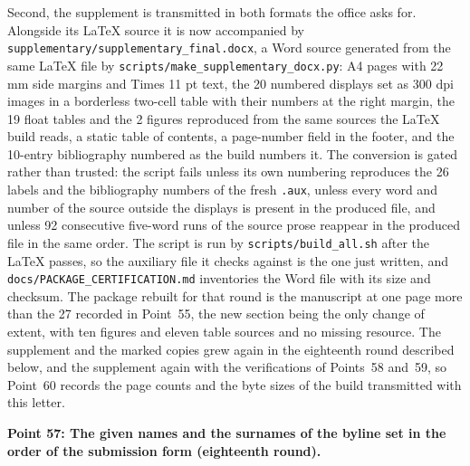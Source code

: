 \documentclass[11pt,a4paper]{article}
\begin{document}
Second, the supplement is transmitted in both formats the office asks for. Alongside
its \LaTeX{} source it is now accompanied by
\texttt{supplementary/}\hspace{0pt}\texttt{supplementary\_final.docx}, a Word source
generated from the same \LaTeX{} file by
\texttt{scripts/}\hspace{0pt}\texttt{make\_supplementary\_docx.py}: A4 pages with 22 mm
side margins and Times 11 pt text, the 20 numbered displays set as 300 dpi images in a
borderless two-cell table with their numbers at the right margin, the 19 float tables
and the 2 figures reproduced from the same sources the \LaTeX{} build reads, a static
table of contents, a page-number field in the footer, and the 10-entry bibliography
numbered as the build numbers it. The conversion is gated rather than trusted: the
script fails unless its own numbering reproduces the 26 labels and the bibliography
numbers of the fresh \texttt{.aux}, unless every word and number of the source outside
the displays is present in the produced file, and unless 92 consecutive five-word runs
of the source prose reappear in the produced file in the same order. The script is run
by \texttt{scripts/}\hspace{0pt}\texttt{build\_all.sh} after the \LaTeX{} passes, so the
auxiliary file it checks against is the one just written, and
\texttt{docs/}\hspace{0pt}\texttt{PACKAGE\_CERTIFICATION.md} inventories the Word file
with its size and checksum. The package rebuilt for that round is the manuscript at one
page more than the 27 recorded in Point~55, the new section being the only change of
extent, with ten figures and eleven table sources and no missing resource. The supplement
and the marked copies grew again in the eighteenth round described below, and the
supplement again with the verifications of Points~58 and~59, so
Point~60 records the page counts and the byte sizes of the build transmitted with this
letter.

\vspace{1em}

\noindent\textbf{Point 57: The given names and the surnames of the byline set in the
order of the submission form (eighteenth round).}
\end{document}
